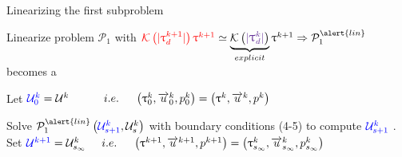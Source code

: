 \begin{frame}{Linearizing the first subproblem}
    \scriptsize


Linearize problem $\mathcal{P}_1$ with $\textcolor{red}{\mathcal{K} \left( | \Tau_d^{k+1} | \right) \Tauk} \simeq \underbrace{\mathcal{K} \left( \textcolor{RoyalPurple}{| \Tau_d^{k} |} \right)}_{explicit} \Tauk 
\\
\Rightarrow \mathcal{P}_1^{\alert{lin}}$ becomes a {\scriptsize{}}

\vskip 0.5cm

Let $\textcolor{blue}{\UU^k_0} = \UU^k
\hspace{1.1cm} i.e. \hspace{0.5cm}
\left(\Tau^k_0, \v^k_0, p^k_0\right) = \left(\Tau^k, \v^k, p^k\right)$

\vskip 0.3cm
Solve $\mathcal{P}_1^{\alert{lin}} 
\left( \textcolor{blue}{\UU^k_{s+1}}, \UU^k_s \right)$ with boundary conditions (4-5) to compute $\textcolor{blue}{\mathcal{U}^k_{s+1}}$ .
\vskip 0.2cm
\hspace{0.3cm}
Set $\textcolor{blue}{\Ukk} = \UU^k_{s_{\infty}} 
\hspace{0.5cm} i.e. \hspace{0.5cm}
\left(\Tauk, \vk, \pk\right) =
\left(\Tau^k_{s_{\infty}}, \v^k_{s_{\infty}}, p^k_{s_{\infty}}\right)$

\end{frame}




